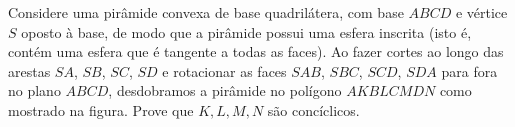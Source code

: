 Considere uma pirâmide convexa de base quadrilátera, com base $ABCD$ e vértice $S$ oposto à base, de modo que a pirâmide possui uma esfera inscrita (isto é, contém uma esfera que é tangente a todas as faces). Ao fazer cortes ao longo das arestas $SA$, $SB$, $SC$, $SD$ e rotacionar as faces $SAB$, $SBC$, $SCD$, $SDA$ para fora no plano $ABCD$, desdobramos a pirâmide no polígono $AKBLCMDN$ como mostrado na figura. Prove que $K,L,M,N$ são concíclicos.

\begin{center}
\def\svgwidth{0.5\textwidth}

\end{center}
